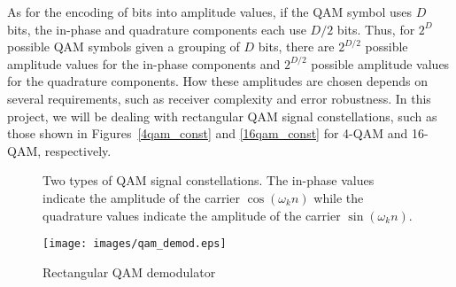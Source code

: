 \documentclass[12pt]{article}
\newcommand{\goodgap}{%
\hspace{\subfigtopskip}%
\hspace{\subfigbottomskip}}
\begin{document}
As for the encoding of bits into amplitude values, if the QAM
symbol uses $D$ bits, the in-phase and quadrature components each
use $D/2$ bits. Thus, for $2^D$ possible QAM symbols given a
grouping of $D$ bits, there are $2^{D/2}$ possible amplitude
values for the in-phase components and $2^{D/2}$ possible
amplitude values for the quadrature components. How these
amplitudes are chosen depends on several requirements, such as
receiver complexity and error robustness. In this project, we will
be dealing with rectangular QAM signal constellations, such as
those shown in Figures~\ref{4qam_const} and \ref{16qam_const} for
4-QAM and 16-QAM, respectively.
\begin{figure}[t]
\begin{center}
\goodgap
{}
\caption{Two types of QAM signal constellations. The in-phase
values indicate the amplitude of the carrier $\cos(\omega_kn)$
while the quadrature values indicate the amplitude of the carrier
$\sin(\omega_kn)$.}
\end{center}
\end{figure}

\begin{figure}[t]
\centering
\texttt{[image: images/qam\_demod.eps]}\\
\caption{Rectangular QAM demodulator}\label{qam_demod}
\end{figure}
\end{document}
